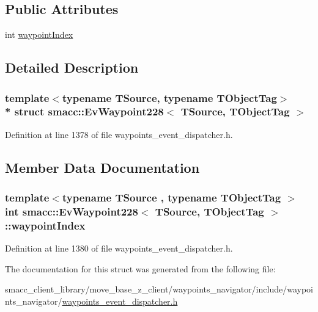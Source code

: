 \subsection*{Public Attributes}
\begin{DoxyCompactItemize}
\item 
int \hyperlink{structsmacc_1_1EvWaypoint228_adc833e427eaed4a1bf68952f9ea804cb}{waypoint\+Index}
\end{DoxyCompactItemize}


\subsection{Detailed Description}
\subsubsection*{template$<$typename T\+Source, typename T\+Object\+Tag$>$\\*
struct smacc\+::\+Ev\+Waypoint228$<$ T\+Source, T\+Object\+Tag $>$}



Definition at line 1378 of file waypoints\+\_\+event\+\_\+dispatcher.\+h.



\subsection{Member Data Documentation}
\subsubsection[{\texorpdfstring{waypoint\+Index}{waypointIndex}}]{\setlength{\rightskip}{0pt plus 5cm}template$<$typename T\+Source , typename T\+Object\+Tag $>$ int {\bf smacc\+::\+Ev\+Waypoint228}$<$ T\+Source, T\+Object\+Tag $>$\+::waypoint\+Index}\hypertarget{structsmacc_1_1EvWaypoint228_adc833e427eaed4a1bf68952f9ea804cb}{}\label{structsmacc_1_1EvWaypoint228_adc833e427eaed4a1bf68952f9ea804cb}


Definition at line 1380 of file waypoints\+\_\+event\+\_\+dispatcher.\+h.



The documentation for this struct was generated from the following file\+:\begin{DoxyCompactItemize}
\item 
smacc\+\_\+client\+\_\+library/move\+\_\+base\+\_\+z\+\_\+client/waypoints\+\_\+navigator/include/waypoints\+\_\+navigator/\hyperlink{waypoints__event__dispatcher_8h}{waypoints\+\_\+event\+\_\+dispatcher.\+h}\end{DoxyCompactItemize}
